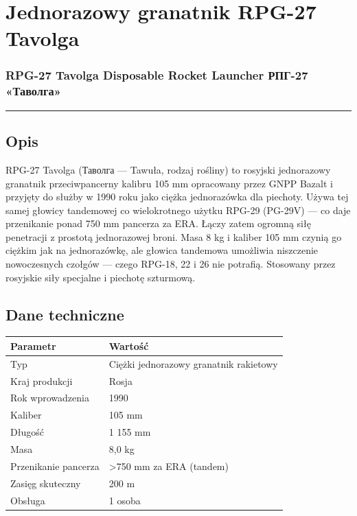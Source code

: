 \documentclass[12pt,openany,oneside]{book}
\begin{document}
\chapter{Jednorazowy granatnik RPG-27
Tavolga}\label{jednorazowy-granatnik-rpg-27-tavolga}

\subsection{RPG-27 Tavolga Disposable Rocket Launcher \textbar{} РПГ-27
«Таволга»}\label{rpg-27-tavolga-disposable-rocket-launcher-ux440ux43fux433-27-ux442ux430ux432ux43eux43bux433ux430}

\begin{center}\rule{0.5\linewidth}{0.5pt}\end{center}

\section{Opis}\label{opis-72}

RPG-27 Tavolga (Таволга --- Tawuła, rodzaj rośliny) to rosyjski
jednorazowy granatnik przeciwpancerny kalibru 105 mm opracowany przez
GNPP Bazalt i przyjęty do służby w 1990 roku jako ciężka jednorazówka
dla piechoty. Używa tej samej głowicy tandemowej co wielokrotnego użytku
RPG-29 (PG-29V) --- co daje przenikanie ponad 750 mm pancerza za ERA.
Łączy zatem ogromną siłę penetracji z prostotą jednorazowej broni. Masa
8 kg i kaliber 105 mm czynią go ciężkim jak na jednorazówkę, ale głowica
tandemowa umożliwia niszczenie nowoczesnych czołgów --- czego RPG-18, 22
i 26 nie potrafią. Stosowany przez rosyjskie siły specjalne i piechotę
szturmową.

\section{Dane techniczne}\label{dane-techniczne-72}

\begin{longtable}[]{@{}ll@{}}
\toprule\noalign{}
Parametr & Wartość \\
\midrule\noalign{}
\endhead
\bottomrule\noalign{}
\endlastfoot
Typ & Ciężki jednorazowy granatnik rakietowy \\
Kraj produkcji & Rosja \\
Rok wprowadzenia & 1990 \\
Kaliber & 105 mm \\
Długość & 1 155 mm \\
Masa & 8,0 kg \\
Przenikanie pancerza & \textgreater750 mm za ERA (tandem) \\
Zasięg skuteczny & 200 m \\
Obsługa & 1 osoba \\
\end{longtable}
\end{document}
